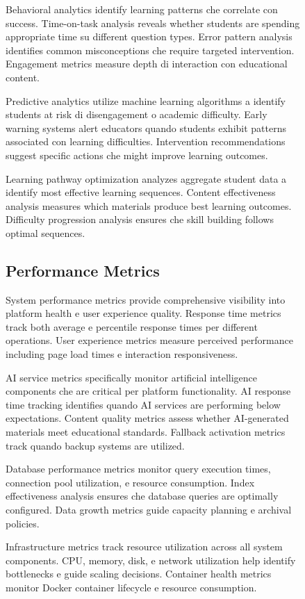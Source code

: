 \documentclass[12pt,a4paper]{article}
\begin{document}
\begin{figure}[H]
Behavioral analytics identify learning patterns che correlate con success. Time-on-task analysis reveals whether students are spending appropriate time su different question types. Error pattern analysis identifies common misconceptions che require targeted intervention. Engagement metrics measure depth di interaction con educational content.

Predictive analytics utilize machine learning algorithms a identify students at risk di disengagement o academic difficulty. Early warning systems alert educators quando students exhibit patterns associated con learning difficulties. Intervention recommendations suggest specific actions che might improve learning outcomes.

Learning pathway optimization analyzes aggregate student data a identify most effective learning sequences. Content effectiveness analysis measures which materials produce best learning outcomes. Difficulty progression analysis ensures che skill building follows optimal sequences.

\subsection{Performance Metrics}

System performance metrics provide comprehensive visibility into platform health e user experience quality. Response time metrics track both average e percentile response times per different operations. User experience metrics measure perceived performance including page load times e interaction responsiveness.

AI service metrics specifically monitor artificial intelligence components che are critical per platform functionality. AI response time tracking identifies quando AI services are performing below expectations. Content quality metrics assess whether AI-generated materials meet educational standards. Fallback activation metrics track quando backup systems are utilized.

Database performance metrics monitor query execution times, connection pool utilization, e resource consumption. Index effectiveness analysis ensures che database queries are optimally configured. Data growth metrics guide capacity planning e archival policies.

Infrastructure metrics track resource utilization across all system components. CPU, memory, disk, e network utilization help identify bottlenecks e guide scaling decisions. Container health metrics monitor Docker container lifecycle e resource consumption.


\end{figure}
\end{document}
